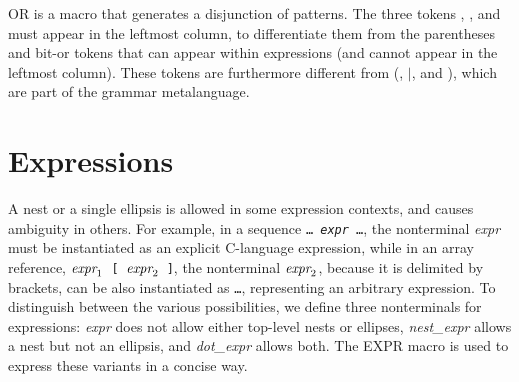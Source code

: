 \documentclass{article}
\newcommand{\mita}[1]{\mbox{\it{{#1}}}}
\newcommand{\mtt}[1]{\mbox{\tt{{#1}}}}
\newcommand{\mth}[1]{\({#1}\)}
\newcommand{\ttmid}{\mbox{\tt \char'174}}
\begin{document}
\begin{grammar}
  \CASE{( \NT{grammar} \ANY{\ttmid \NT{grammar}})}


\end{grammar}


\noindent
OR is a macro that generates a disjunction of patterns.  The three
tokens \T{(}, \T{\ttmid}, and \T{)} must appear in the leftmost
column, to differentiate them from the parentheses and bit-or tokens
that can appear within expressions (and cannot appear in the leftmost
column).  These tokens are furthermore different from (, \(\mid\), and
), which are part of the grammar metalanguage.

\section{Expressions}

A nest or a single ellipsis is allowed in some expression contexts, and
causes ambiguity in others.  For example, in a sequence \mtt{\ldots
\mita{expr} \ldots}, the nonterminal \mita{expr} must be instantiated as an
explicit C-language expression, while in an array reference,
\mtt{\mth{\mita{expr}_1} \mtt{[} \mth{\mita{expr}_2} \mtt{]}}, the
nonterminal \mth{\mita{expr}_2}, because it is delimited by brackets, can
be also instantiated as \mtt{\ldots}, representing an arbitrary expression.  To
distinguish between the various possibilities, we define three nonterminals
for expressions: {\em expr} does not allow either top-level nests or
ellipses, {\em nest\_expr} allows a nest but not an ellipsis, and {\em
dot\_expr} allows both.  The EXPR macro is used to express these variants
in a concise way.
\end{document}
